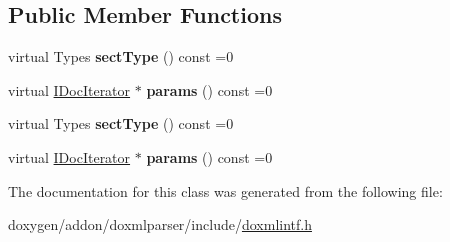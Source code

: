 \subsection*{Public Member Functions}
\begin{DoxyCompactItemize}
\item 
\mbox{\label{class_i_doc_parameter_list_a96ce1bf68cc558403ac4cacae5ceef00}} 
virtual Types {\bfseries sect\+Type} () const =0
\item 
\mbox{\label{class_i_doc_parameter_list_ad89a34c5718c1d3fe66ceaccc98eb977}} 
virtual \mbox{\hyperlink{class_i_doc_iterator}{I\+Doc\+Iterator}} $\ast$ {\bfseries params} () const =0
\item 
\mbox{\label{class_i_doc_parameter_list_a96ce1bf68cc558403ac4cacae5ceef00}} 
virtual Types {\bfseries sect\+Type} () const =0
\item 
\mbox{\label{class_i_doc_parameter_list_ad89a34c5718c1d3fe66ceaccc98eb977}} 
virtual \mbox{\hyperlink{class_i_doc_iterator}{I\+Doc\+Iterator}} $\ast$ {\bfseries params} () const =0
\end{DoxyCompactItemize}


The documentation for this class was generated from the following file\+:\begin{DoxyCompactItemize}
\item 
doxygen/addon/doxmlparser/include/\mbox{\hyperlink{include_2doxmlintf_8h}{doxmlintf.\+h}}\end{DoxyCompactItemize}
